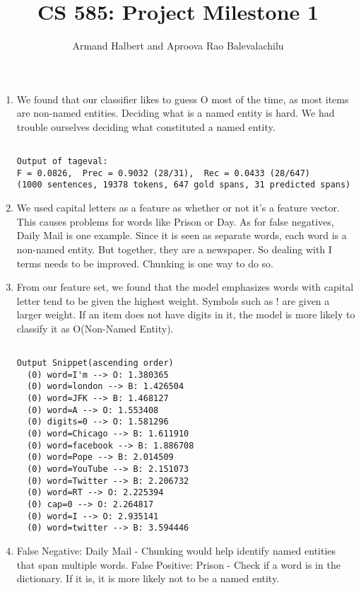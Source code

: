 \documentclass[twoside]{article}
\title{CS 585: Project Milestone 1}
\author{Armand Halbert and Aproova Rao Balevalachilu}
\begin{document}
\maketitle
\begin{enumerate}
    \item 
We found that our classifier likes to guess O most of the time, as most items are non-named entities. Deciding what is a named entity is hard. We had trouble ourselves deciding what constituted a named entity.

\begin{lstlisting}
    
Output of tageval:
F = 0.0826,  Prec = 0.9032 (28/31),  Rec = 0.0433 (28/647)
(1000 sentences, 19378 tokens, 647 gold spans, 31 predicted spans)
\end{lstlisting}
\newline
\newline
\item We used capital letters as a feature as whether or not it's a feature vector. This causes problems for words like Prison or Day. As for false negatives, Daily Mail is one example. Since it is seen as separate words, each word is a non-named entity.
But together, they are a newspaper. So dealing with I terms needs to be improved. Chunking is one way to do so.
\newline
\newline
\item From our feature set, we found that the model emphasizes words with capital letter tend to be given the highest weight. Symbols such as ! are given a larger weight. If an item does not have digits in it, the model is more likely to classify it as O(Non-Named Entity).
\begin{lstlisting}
    
Output Snippet(ascending order)
  (0) word=I'm --> O: 1.380365
  (0) word=london --> B: 1.426504
  (0) word=JFK --> B: 1.468127
  (0) word=A --> O: 1.553408
  (0) digits=0 --> O: 1.581296
  (0) word=Chicago --> B: 1.611910
  (0) word=facebook --> B: 1.886708
  (0) word=Pope --> B: 2.014509
  (0) word=YouTube --> B: 2.151073
  (0) word=Twitter --> B: 2.206732
  (0) word=RT --> O: 2.225394
  (0) cap=0 --> O: 2.264817
  (0) word=I --> O: 2.935141
  (0) word=twitter --> B: 3.594446
\end{lstlisting}

\newline
\newline
\item False Negative: Daily Mail - Chunking would help identify named entities that span multiple words.
False Positive: Prison - Check if a word is in the dictionary. If it is, it is more likely not to be a named entity.


\end{enumerate}
\end{document}
